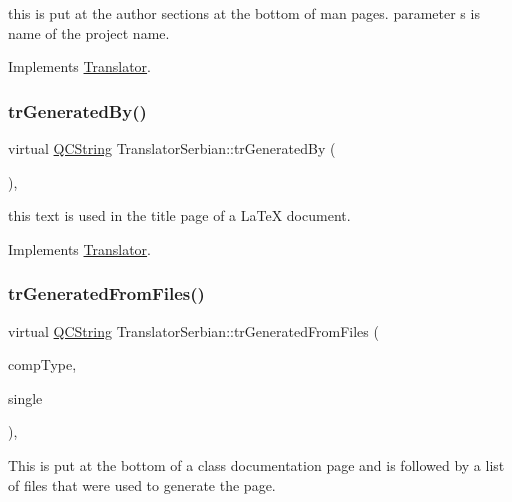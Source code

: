 this is put at the author sections at the bottom of man pages. parameter s is name of the project name. 

Implements \mbox{\hyperlink{class_translator}{Translator}}.

\mbox{\label{class_translator_serbian_a2d31f0572daa6401590b64d6de6c696d}} 
\subsubsection{\texorpdfstring{trGeneratedBy()}{trGeneratedBy()}}
{\footnotesize\ttfamily virtual \mbox{\hyperlink{class_q_c_string}{Q\+C\+String}} Translator\+Serbian\+::tr\+Generated\+By (\begin{DoxyParamCaption}{ }\end{DoxyParamCaption})\hspace{0.3cm}{\ttfamily [inline]}, {\ttfamily [virtual]}}

this text is used in the title page of a La\+TeX document. 

Implements \mbox{\hyperlink{class_translator}{Translator}}.

\mbox{\label{class_translator_serbian_aa8b4c7f009f386e5e09e1879cf400e9f}} 
\subsubsection{\texorpdfstring{trGeneratedFromFiles()}{trGeneratedFromFiles()}}
{\footnotesize\ttfamily virtual \mbox{\hyperlink{class_q_c_string}{Q\+C\+String}} Translator\+Serbian\+::tr\+Generated\+From\+Files (\begin{DoxyParamCaption}\item[{\mbox{\hyperlink{class_class_def_ae70cf86d35fe954a94c566fbcfc87939}{Class\+Def\+::\+Compound\+Type}}}]{comp\+Type,  }\item[{bool}]{single }\end{DoxyParamCaption})\hspace{0.3cm}{\ttfamily [inline]}, {\ttfamily [virtual]}}

This is put at the bottom of a class documentation page and is followed by a list of files that were used to generate the page. 


